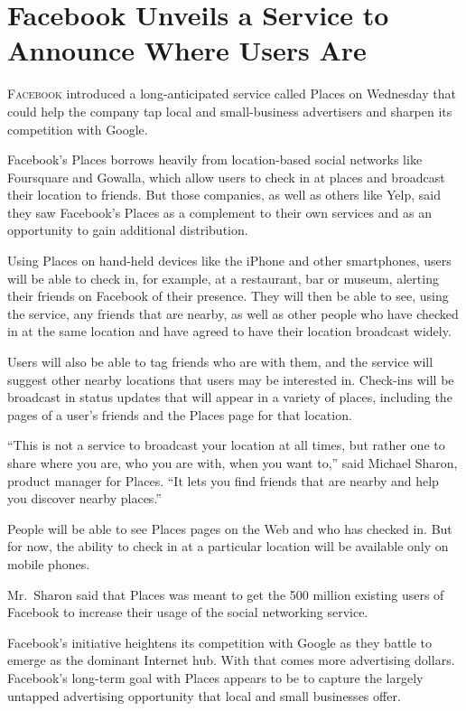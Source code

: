 ﻿\documentclass[12pt]{article}
\begin{document}
\section{Facebook Unveils a Service to Announce Where Users Are}

\lettrine{F}{acebook} introduced a long-anticipated service called Places on
Wednesday that could help the company tap local and small-business advertisers and sharpen its
competition with Google.

Facebook's Places borrows heavily from location-based social networks like Foursquare and Gowalla,
which allow users to check in at places and broadcast their location to friends. But those
companies, as well as others like Yelp, said they saw Facebook's Places as a complement to their own
services and as an opportunity to gain additional distribution.

Using Places on hand-held devices like the iPhone and other smartphones, users will be able to check
in, for example, at a restaurant, bar or museum, alerting their friends on Facebook of their
presence. They will then be able to see, using the service, any friends that are nearby, as well as
other people who have checked in at the same location and have agreed to have their location
broadcast widely.

Users will also be able to tag friends who are with them, and the service will suggest other nearby
locations that users may be interested in. Check-ins will be broadcast in status updates that will
appear in a variety of places, including the pages of a user's friends and the Places page for that
location.

``This is not a service to broadcast your location at all times, but rather one to share where you
are, who you are with, when you want to,'' said Michael Sharon, product manager for Places. ``It
lets you find friends that are nearby and help you discover nearby places.''

People will be able to see Places pages on the Web and who has checked in. But for now, the ability
to check in at a particular location will be available only on mobile phones.

Mr.~Sharon said that Places was meant to get the 500 million existing users of Facebook to increase
their usage of the social networking service.

Facebook's initiative heightens its competition with Google as they battle to emerge as the dominant
Internet hub. With that comes more advertising dollars. Facebook's long-term goal with Places
appears to be to capture the largely untapped advertising opportunity that local and small
businesses offer.
\end{document}
